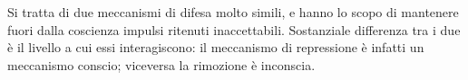 \documentclass{subfiles}
\begin{document}
Si tratta di due meccanismi di difesa molto simili, e hanno lo scopo di mantenere fuori dalla coscienza impulsi ritenuti inaccettabili.
Sostanziale differenza tra i due è il livello a cui essi interagiscono: il meccanismo di repressione è infatti un meccanismo conscio;
viceversa la rimozione è inconscia.
\end{document}

